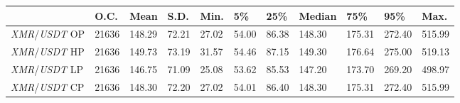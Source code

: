\begin{tabular}{lllllllllll}
\toprule
 & \textbf{O.C.} & \textbf{Mean} & \textbf{S.D.} & \textbf{Min.} & \textbf{5\%} & \textbf{25\%} & \textbf{Median} & \textbf{75\%} & \textbf{95\%} & \textbf{Max.} \\
\midrule
\emph{XMR}/\emph{USDT} OP & 21636 & 148.29 & 72.21 & 27.02 & 54.00 & 86.38 & 148.30 & 175.31 & 272.40 & 515.99 \\
\emph{XMR}/\emph{USDT} HP & 21636 & 149.73 & 73.19 & 31.57 & 54.46 & 87.15 & 149.30 & 176.64 & 275.00 & 519.13 \\
\emph{XMR}/\emph{USDT} LP & 21636 & 146.75 & 71.09 & 25.08 & 53.62 & 85.53 & 147.20 & 173.70 & 269.20 & 498.97 \\
\emph{XMR}/\emph{USDT} CP & 21636 & 148.30 & 72.20 & 27.02 & 54.01 & 86.40 & 148.30 & 175.31 & 272.40 & 515.99 \\
\bottomrule
\end{tabular}
